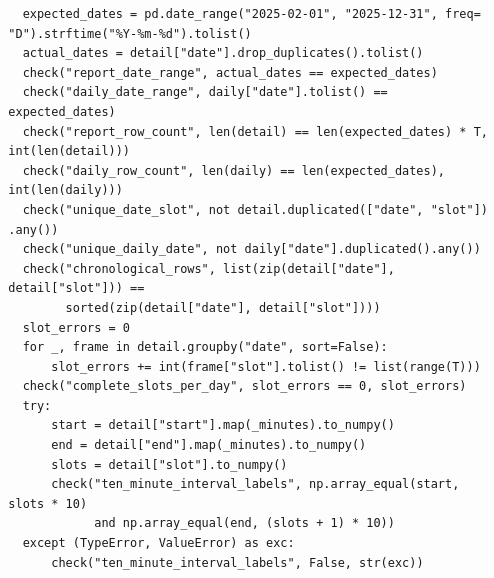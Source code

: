 \begin{verbatim}
    expected_dates = pd.date_range("2025-02-01", "2025-12-31", freq=
  "D").strftime("%Y-%m-%d").tolist()
    actual_dates = detail["date"].drop_duplicates().tolist()
    check("report_date_range", actual_dates == expected_dates)
    check("daily_date_range", daily["date"].tolist() ==
  expected_dates)
    check("report_row_count", len(detail) == len(expected_dates) * T,
  int(len(detail)))
    check("daily_row_count", len(daily) == len(expected_dates),
  int(len(daily)))
    check("unique_date_slot", not detail.duplicated(["date", "slot"])
  .any())
    check("unique_daily_date", not daily["date"].duplicated().any())
    check("chronological_rows", list(zip(detail["date"],
  detail["slot"])) ==
          sorted(zip(detail["date"], detail["slot"])))
    slot_errors = 0
    for _, frame in detail.groupby("date", sort=False):
        slot_errors += int(frame["slot"].tolist() != list(range(T)))
    check("complete_slots_per_day", slot_errors == 0, slot_errors)
    try:
        start = detail["start"].map(_minutes).to_numpy()
        end = detail["end"].map(_minutes).to_numpy()
        slots = detail["slot"].to_numpy()
        check("ten_minute_interval_labels", np.array_equal(start,
  slots * 10)
              and np.array_equal(end, (slots + 1) * 10))
    except (TypeError, ValueError) as exc:
        check("ten_minute_interval_labels", False, str(exc))


\end{verbatim}
